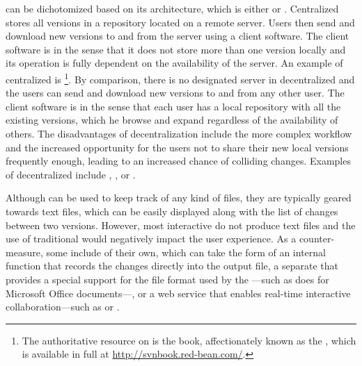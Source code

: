 \documentclass[a5paper,10pt]{book}
\begin{document}
 can be dichotomized based on its architecture, which is either
 or . Centralized  stores
all versions in a repository located on a remote server. Users then send and
download new versions to and from the server using a client software. The client
software is  in the sense that it does not store more than one
version locally and its operation is fully dependent on the availability of the
server. An example of centralized  is \footnote{
  The authoritative resource on  is the  book, affectionately known as the ,
  which is available in full at \url{http://svnbook.red-bean.com/}.
}. By comparison,
there is no designated server in decentralized  and the users can
send and download new versions to and from any other user. The client software
is  in the sense that each user has a local repository with all the
existing versions, which he browse and expand regardless of the availability of
others. The disadvantages of decentralization include the more complex workflow
and the increased opportunity for the users not to share their new local
versions frequently enough, leading to an increased chance of colliding changes.
Examples of decentralized  include , , or
.


Although  can be used to keep track of any kind of files, they are
typically geared towards text files, which can be easily displayed along with
the list of changes between two versions. However, most interactive 
do not produce text files and the use of traditional  would
negatively impact the user experience. As a counter-measure, some 
include  of their own, which can take the form of an internal
function that records the changes directly into the output file, a separate
 that provides a special support for the file format used by the
---such as  does for Microsoft Office
documents---, or a web service that enables real-time interactive
collaboration---such as  or .
\end{document}
